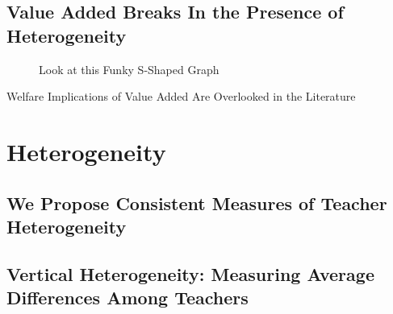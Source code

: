 \documentclass[letterpaper,12pt]{article}
\begin{document}
\subsection{Value Added Breaks In the Presence of Heterogeneity}



\begin{figure}
    \centering
    \caption{Look at this Funky S-Shaped Graph}
    \label{fig:my_label}
\end{figure}


\begin{table}[]
    \centering
    \caption{Welfare Implications of Value Added Are Overlooked in the Literature}
    \label{tab:my_label}
\end{table}
   



\section{Heterogeneity}\label{sec: Results}

\subsection{We Propose Consistent Measures of Teacher Heterogeneity}



\subsection{Vertical Heterogeneity: Measuring Average Differences Among Teachers}
\end{document}
